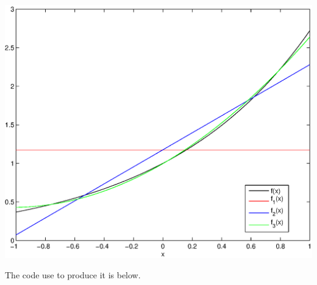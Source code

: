 \begin{solution}
\begin{enumerate}
\begin{center} \includegraphics[scale=0.5]{hw17d} \end{center}

The code use to produce it is below.


\end{enumerate}

\end{solution}

